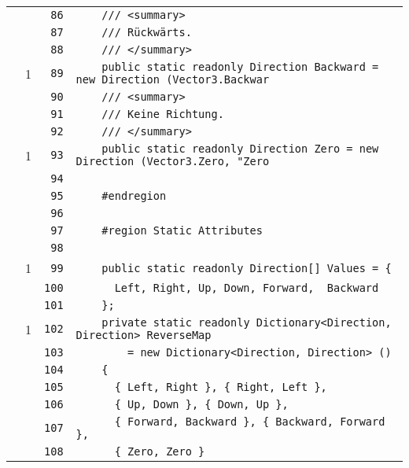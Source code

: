 \documentclass[a4paper,10pt]{article}
\begin{document}
\begin{longtable}[l]{lrrl}
\cellcolor{gray} &  & \verb~86~ & \verb~    /// <summary>~\\
\cellcolor{gray} &  & \verb~87~ & \verb~    /// Rückwärts.~\\
\cellcolor{gray} &  & \verb~88~ & \verb~    /// </summary>~\\
\cellcolor{green} & 1 & \verb~89~ & \verb~    public static readonly Direction Backward = new Direction (Vector3.Backwar~\\
\cellcolor{gray} &  & \verb~90~ & \verb~    /// <summary>~\\
\cellcolor{gray} &  & \verb~91~ & \verb~    /// Keine Richtung.~\\
\cellcolor{gray} &  & \verb~92~ & \verb~    /// </summary>~\\
\cellcolor{green} & 1 & \verb~93~ & \verb~    public static readonly Direction Zero = new Direction (Vector3.Zero, "Zero~\\
\cellcolor{gray} &  & \verb~94~ & \verb~~\\
\cellcolor{gray} &  & \verb~95~ & \verb~    #endregion~\\
\cellcolor{gray} &  & \verb~96~ & \verb~~\\
\cellcolor{gray} &  & \verb~97~ & \verb~    #region Static Attributes~\\
\cellcolor{gray} &  & \verb~98~ & \verb~~\\
\cellcolor{green} & 1 & \verb~99~ & \verb~    public static readonly Direction[] Values = {~\\
\cellcolor{gray} &  & \verb~100~ & \verb~      Left, Right, Up, Down, Forward,  Backward~\\
\cellcolor{gray} &  & \verb~101~ & \verb~    };~\\
\cellcolor{green} & 1 & \verb~102~ & \verb~    private static readonly Dictionary<Direction, Direction> ReverseMap~\\
\cellcolor{gray} &  & \verb~103~ & \verb~        = new Dictionary<Direction, Direction> ()~\\
\cellcolor{gray} &  & \verb~104~ & \verb~    {~\\
\cellcolor{gray} &  & \verb~105~ & \verb~      { Left, Right }, { Right, Left },~\\
\cellcolor{gray} &  & \verb~106~ & \verb~      { Up, Down }, { Down, Up },~\\
\cellcolor{gray} &  & \verb~107~ & \verb~      { Forward, Backward }, { Backward, Forward },~\\
\cellcolor{gray} &  & \verb~108~ & \verb~      { Zero, Zero }~\\

\end{longtable}
\end{document}

